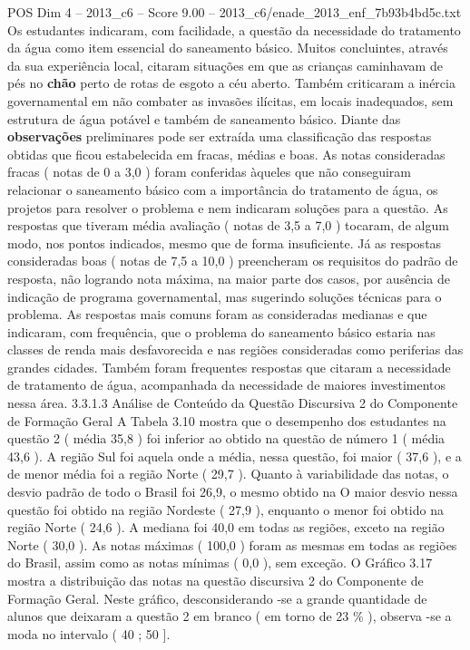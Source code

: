 \begin{textsample}{POS Dim 4 – 2013\_c6 – Score 9.00 – 2013\_c6/enade\_2013\_enf\_7b93b4bd5c.txt}
Os estudantes indicaram, com facilidade, a questão da necessidade do tratamento da água como item essencial do saneamento básico.
Muitos concluintes, através da sua experiência local, citaram situações em que as crianças caminhavam de pés no \textbf{chão} perto de rotas de esgoto a céu aberto.
Também criticaram a inércia governamental em não combater as invasões ilícitas, em locais inadequados, sem estrutura de água potável e também de saneamento básico.
Diante das \textbf{observações} preliminares pode ser extraída uma classificação das respostas obtidas que ficou estabelecida em fracas, médias e boas.
As notas consideradas fracas ( notas de 0 a 3,0 ) foram conferidas àqueles que não conseguiram relacionar o saneamento básico com a importância do tratamento de água, os projetos para resolver o problema e nem indicaram soluções para a questão.
As respostas que tiveram média avaliação ( notas de 3,5 a 7,0 ) tocaram, de algum modo, nos pontos indicados, mesmo que de forma insuficiente.
Já as respostas consideradas boas ( notas de 7,5 a 10,0 ) preencheram os requisitos do padrão de resposta, não logrando nota máxima, na maior parte dos casos, por ausência de indicação de programa governamental, mas sugerindo soluções técnicas para o problema.
As respostas mais comuns foram as consideradas medianas e que indicaram, com frequência, que o problema do saneamento básico estaria nas classes de renda mais desfavorecida e nas regiões consideradas como periferias das grandes cidades.
Também foram frequentes respostas que citaram a necessidade de tratamento de água, acompanhada da necessidade de maiores investimentos nessa área. 3.3.1.3 Análise de Conteúdo da Questão Discursiva 2 do Componente de Formação Geral A Tabela 3.10 mostra que o desempenho dos estudantes na questão 2 ( média 35,8 ) foi inferior ao obtido na questão de número 1 ( média 43,6 ).
A região Sul foi aquela onde a média, nessa questão, foi maior ( 37,6 ), e a de menor média foi a região Norte ( 29,7 ).
Quanto à variabilidade das notas, o desvio padrão de todo o Brasil foi 26,9, o mesmo obtido na O maior desvio nessa questão foi obtido na região Nordeste ( 27,9 ), enquanto o menor foi obtido na região Norte ( 24,6 ).
A mediana foi 40,0 em todas as regiões, exceto na região Norte ( 30,0 ).
As notas máximas ( 100,0 ) foram as mesmas em todas as regiões do Brasil, assim como as notas mínimas ( 0,0 ), sem exceção.
O Gráfico 3.17 mostra a distribuição das notas na questão discursiva 2 do Componente de Formação Geral.
Neste gráfico, desconsiderando -se a grande quantidade de alunos que deixaram a questão 2 em branco ( em torno de 23 \% ), observa -se a moda no intervalo ( 40 ; 50 ].

\end{textsample}
